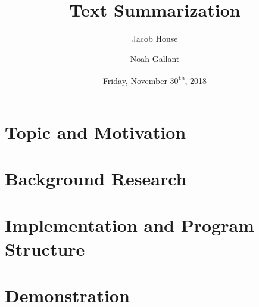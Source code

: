\documentclass[12pt]{article}
\title{Text Summarization}
\author{Jacob House \and Noah Gallant}
\date{Friday, November 30\textsuperscript{th}, 2018}
\begin{document}
	\maketitle
	\tableofcontents 
	\setcounter{page}{1}
	\section{Topic and Motivation}
	
	
	\section{Background Research}
	
	
	\section{Implementation and Program Structure}
	
	
	\printbibliography
	\appendix
	\section{Demonstration}
	
	
\end{document}
